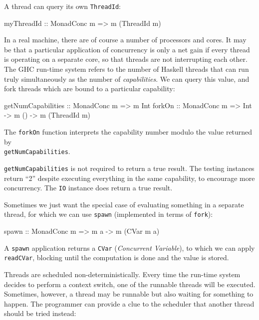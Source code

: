 A thread can query its own \verb|ThreadId|:

\begin{haskellcode}
myThreadId :: MonadConc m => m (ThreadId m)
\end{haskellcode}

In a real machine, there are of course a number of processors and
cores. It may be that a particular application of concurrency is only
a net gain if every thread is operating on a separate core, so that
threads are not interrupting each other. The GHC run-time system
refers to the number of Haskell threads that can run truly
simultaneously as the number of \emph{capabilities}. We can query this
value, and fork threads which are bound to a particular capability:

\begin{haskellcode}
getNumCapabilities :: MonadConc m => m Int
forkOn :: MonadConc m => Int -> m () -> m (ThreadId m)
\end{haskellcode}

The \verb|forkOn| function interprets the capability number modulo the
value returned by \\\verb|getNumCapabilities|.

\begin{departure}
  \verb|getNumCapabilities| is not required to return a true
  result. The testing instances return ``2'' despite executing
  everything in the same capability, to encourage more
  concurrency. The \verb|IO| instance does return a true result.
\end{departure}

Sometimes we just want the special case of evaluating something in a
separate thread, for which we can use \verb|spawn| (implemented in
terms of \verb|fork|):

\begin{haskellcode}
spawn :: MonadConc m => m a -> m (CVar m a)
\end{haskellcode}

A \verb|spawn| application returns a \verb|CVar| (\emph{Concurrent
  Variable}), to which we can apply \verb|readCVar|, blocking until
the computation is done and the value is stored.

Threads are scheduled non-deterministically. Every time the run-time
system decides to perform a context switch, one of the runnable
threads will be executed. Sometimes, however, a thread may be runnable
but also waiting for something to happen. The programmer can provide a
clue to the scheduler that another thread should be tried instead:

